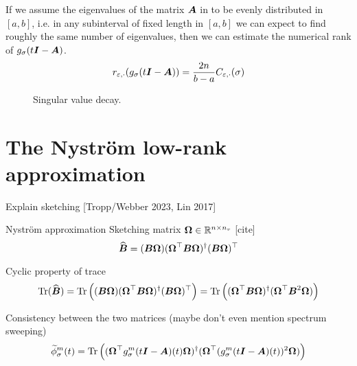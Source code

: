 If we assume the eigenvalues of the matrix $\boldsymbol{A}$ in 
to be evenly distributed in $[a, b]$, i.e. in any subinterval of fixed length in
$[a, b]$ we can expect to find roughly the same number of eigenvalues, then
we can estimate the numerical rank of $g_{\sigma}(t\boldsymbol{I} - \boldsymbol{A})$.
\begin{equation}
    r_{\varepsilon, \cdot}(g_{\sigma}(t\boldsymbol{I} - \boldsymbol{A})) = \frac{2 n}{b - a} C_{\varepsilon, \cdot}(\sigma)
\end{equation}

\begin{figure}[ht]
    \centering
    \caption{Singular value decay. }
    \label{fig:3-nystrom-singular-value-decay}
\end{figure}


\section{The Nystr\"om low-rank approximation}
\label{sec:3-nystrom-nystrom}

Explain sketching [Tropp/Webber 2023, Lin 2017]

Nyström approximation \cite{gittens2013nystrom}
Sketching matrix $\boldsymbol{\Omega} \in \mathbb{R}^{n \times n_v}$ [cite]
\begin{equation}
    \widehat{\boldsymbol{B}} = (\boldsymbol{B} \boldsymbol{\Omega}) (\boldsymbol{\Omega}^{\top} \boldsymbol{B} \boldsymbol{\Omega})^{\dagger} (\boldsymbol{B} \boldsymbol{\Omega})^{\top}
    \label{equ:3-nystrom-SS-nystrom}
\end{equation}

Cyclic property of trace
\begin{equation}
    \operatorname{Tr}(\widehat{\boldsymbol{B}})
        = \operatorname{Tr}\left((\boldsymbol{B} \boldsymbol{\Omega}) (\boldsymbol{\Omega}^{\top} \boldsymbol{B} \boldsymbol{\Omega})^{\dagger} (\boldsymbol{B} \boldsymbol{\Omega})^{\top} \right)
        = \operatorname{Tr}\left((\boldsymbol{\Omega}^{\top} \boldsymbol{B} \boldsymbol{\Omega})^{\dagger} (\boldsymbol{\Omega}^{\top} \boldsymbol{B}^2 \boldsymbol{\Omega}) \right)
    \label{equ:3-nystrom-nystrom-trace}
\end{equation}

Consistency between the two matrices (maybe don't even mention spectrum sweeping)
\begin{equation}
    \widetilde{\phi}_{\sigma}^m(t)
        = \operatorname{Tr}\left((\boldsymbol{\Omega}^{\top} g_{\sigma}^m(t\boldsymbol{I} - \boldsymbol{A})(t) \boldsymbol{\Omega})^{\dagger} (\boldsymbol{\Omega}^{\top} (g_{\sigma}^m(t\boldsymbol{I} - \boldsymbol{A})(t))^2 \boldsymbol{\Omega})\right)
    \label{equ:3-nystrom-spectral-density}
\end{equation}

